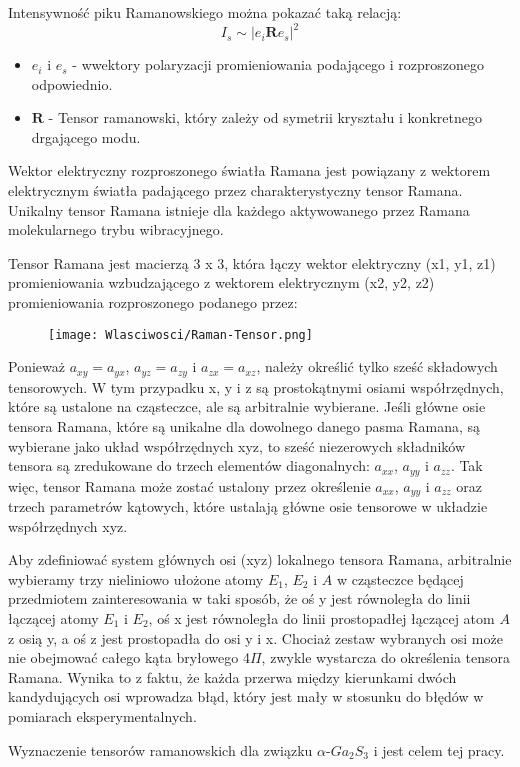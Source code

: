 Intensywność piku Ramanowskiego można pokazać taką relacją:
\begin{equation}
	I_{s} \sim |e_{i}\mathbf{R}e_{s}|^{2}
\end{equation}
\begin{itemize}
	\item $e_{i}$ i $e_{s}$ - wwektory polaryzacji promieniowania podającego i rozproszonego odpowiednio.
	\item $\mathbf{R}$ - Tensor ramanowski, który zależy od symetrii kryształu i konkretnego drgającego modu.
\end{itemize}

Wektor elektryczny rozproszonego światła Ramana jest powiązany z wektorem elektrycznym światła padającego przez charakterystyczny tensor Ramana. Unikalny tensor Ramana istnieje dla każdego aktywowanego przez Ramana molekularnego trybu wibracyjnego.

Tensor Ramana jest macierzą 3 x 3, która łączy wektor elektryczny (x1, y1, z1) promieniowania wzbudzającego z wektorem elektrycznym (x2, y2, z2) promieniowania rozproszonego podanego przez:

\begin{figure}[H]
	\begin{center}
		\texttt{[image: Wlasciwosci/Raman-Tensor.png]}
	\end{center}
\end{figure}

Ponieważ $a_{xy} = a_{yx}$, $a_{yz} = a_{zy}$ i $a_{zx} = a_{xz}$, należy określić tylko sześć składowych tensorowych. W tym przypadku x, y i z są prostokątnymi osiami współrzędnych, które są ustalone na cząsteczce, ale są arbitralnie wybierane. Jeśli główne osie tensora Ramana, które są unikalne dla dowolnego danego pasma Ramana, są wybierane jako układ współrzędnych xyz, to sześć niezerowych składników tensora są zredukowane do trzech elementów diagonalnych: $a_{xx}$, $a_{yy}$ i $a_{zz}$. Tak więc, tensor Ramana może zostać ustalony przez określenie $a_{xx}$, $a_{yy}$ i $a_{zz}$ oraz trzech parametrów kątowych, które ustalają główne osie tensorowe w układzie współrzędnych xyz.

Aby zdefiniować system głównych osi (xyz) lokalnego tensora Ramana, arbitralnie wybieramy trzy nieliniowo ułożone atomy $E_1$, $E_2$ i $A$ w cząsteczce będącej przedmiotem zainteresowania w taki sposób, że oś y jest równoległa do linii łączącej atomy $E_1$ i $E_2$, oś x jest równoległa do linii prostopadłej łączącej atom $A$ z osią y, a oś z jest prostopadła do osi y i x. Chociaż zestaw wybranych osi może nie obejmować całego kąta bryłowego 4$\Pi$, zwykle wystarcza do określenia tensora Ramana. Wynika to z faktu, że każda przerwa między kierunkami dwóch kandydujących osi wprowadza błąd, który jest mały w stosunku do błędów w pomiarach eksperymentalnych.


Wyznaczenie tensorów ramanowskich dla związku $\alpha$-$Ga_{2}S_{3}$ i jest celem tej pracy.



